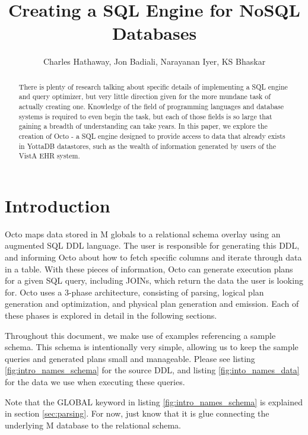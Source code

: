 \documentclass[]{article}
\title{Creating a SQL Engine for NoSQL Databases}
\author{Charles Hathaway, Jon Badiali, Narayanan Iyer, KS Bhaskar}
\begin{document}
\maketitle

\tableofcontents

\begin{abstract}
	
	There is plenty of research talking about specific details of implementing a SQL engine and query optimizer, but very little direction given for the more mundane task of actually creating one.
	Knowledge of the field of programming languages and database systems is required to even begin the task, but each of those fields is so large that gaining a breadth of understanding can take years.
	In this paper, we explore the creation of Octo - a SQL engine designed to provide access to data that already exists in YottaDB datastores, such as the wealth of information generated by users of the VistA EHR system.

\end{abstract}


\section{Introduction}

Octo maps data stored in M globals to a relational schema overlay using an augmented SQL DDL language.
The user is responsible for generating this DDL, and informing Octo about how to fetch specific columns and iterate through data in a table.
With these pieces of information, Octo can generate execution plans for a given SQL query, including JOINs, which return the data the user is looking for.
Octo uses a 3-phase architecture, consisting of parsing, logical plan generation and optimization, and physical plan generation and emission.
Each of these phases is explored in detail in the following sections.

Throughout this document, we make use of examples referencing a sample schema.
This schema is intentionally very simple, allowing us to keep the sample queries and generated plans small and manageable.
Please see listing \ref{fig:intro_names_schema} for the source DDL, and listing \ref{fig:into_names_data} for the data we use when executing these queries.

Note that the GLOBAL keyword in listing \ref{fig:intro_names_schema} is explained in section \ref{sec:parsing}.
For now, just know that it is glue connecting the underlying M database to the relational schema.
\end{document}
